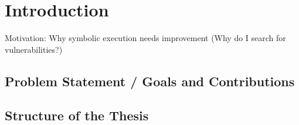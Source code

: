 \chapter{Introduction}

Motivation: Why symbolic execution needs improvement (Why do I search for vulnerabilities?)

\section{Problem Statement / Goals and Contributions}

\section{Structure of the Thesis}

